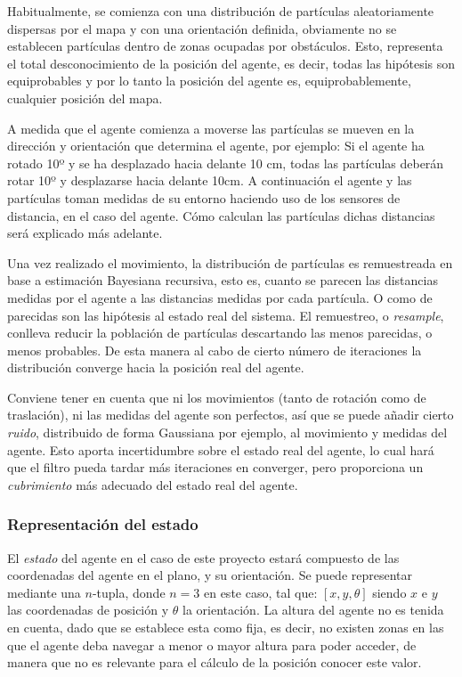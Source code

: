 Habitualmente, se comienza con una distribución de partículas aleatoriamente dispersas por el mapa y con una orientación definida, obviamente no se establecen partículas dentro de zonas ocupadas por obstáculos. Esto, representa el total desconocimiento de la posición del agente, es decir, todas las hipótesis son equiprobables y por lo tanto la posición del agente es, equiprobablemente, cualquier posición del mapa.

A medida que el agente comienza a  moverse las partículas se mueven en la dirección y orientación que determina el agente, por ejemplo: Si el agente ha rotado 10º y se ha desplazado hacia delante 10 cm, todas las partículas deberán rotar 10º y desplazarse hacia delante 10cm. 
A continuación el agente y las partículas toman medidas de su entorno haciendo uso de los sensores de distancia, en el caso del agente. Cómo calculan las partículas dichas distancias será explicado más adelante.

Una vez realizado el movimiento, la distribución de partículas es remuestreada en base a estimación Bayesiana recursiva, esto es, cuanto se parecen las distancias medidas por el agente a las distancias medidas por cada partícula. O como de parecidas son las hipótesis al estado real del sistema.
El remuestreo, o \textit{resample}, conlleva reducir la población de partículas descartando las menos parecidas, o menos probables. De esta manera al cabo de cierto número de iteraciones la distribución converge hacia la posición real del agente. 

Conviene tener en cuenta que ni los movimientos (tanto de rotación como de traslación), ni las medidas del agente son perfectos, así que se puede añadir cierto \textit{ruido}, distribuido de forma Gaussiana por ejemplo, al movimiento y medidas del agente.
Esto aporta incertidumbre sobre el estado real del agente, lo cual hará que el filtro pueda tardar más iteraciones en converger, pero proporciona un \textit{cubrimiento} más adecuado del estado real del agente.

\subsubsection{Representación del estado}
El \textit{estado} del agente en el caso de este proyecto estará compuesto de las coordenadas del agente en el plano, y su orientación. Se puede representar mediante una $n$-tupla, donde $n=3$ en este caso, tal que: $[x, y, \theta]$ siendo $x$ e $y$ las coordenadas de posición y $\theta$ la orientación. La altura del agente no es tenida en cuenta, dado que se establece esta como fija, es decir, no existen zonas en las que el agente deba navegar a menor o mayor altura para poder acceder, de manera que no es relevante para el cálculo de la posición conocer este valor.

